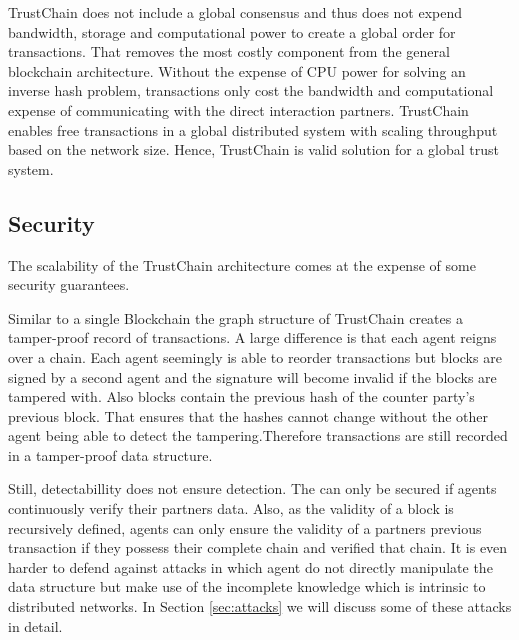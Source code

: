 TrustChain does not include a global consensus and thus does not expend bandwidth, storage and 
computational power to create a global order for transactions. That removes the most costly component
from the general blockchain architecture. Without the expense of CPU power for solving an inverse 
hash problem, transactions only cost the bandwidth and computational expense of communicating with 
the direct interaction partners. TrustChain enables free transactions in a global distributed 
system with scaling throughput based on the network size. Hence, TrustChain is valid solution for a
global trust system.

\subsection{Security}
The scalability of the TrustChain architecture comes at the expense of some security guarantees.

Similar to a single Blockchain the graph structure of TrustChain creates a tamper-proof record of
transactions. A large difference is that each agent reigns over a chain. Each agent seemingly is 
able to reorder transactions but blocks are signed by a second agent and the signature will become
invalid if the blocks are tampered with. Also blocks contain the previous hash of the counter party's
previous block. That ensures that the hashes cannot change without the other agent being able to 
detect the tampering.Therefore transactions are still recorded in a tamper-proof data structure.

Still, detectabillity does not ensure detection. The can only be secured if agents
continuously verify their partners data. Also, as the validity of a block is recursively defined, 
agents can only ensure the validity of a partners previous transaction if they possess their complete
chain and verified that chain. It is even harder to defend against attacks in which agent do not 
directly manipulate the data structure but make use of the incomplete knowledge which is intrinsic 
to distributed networks. In Section \ref{sec:attacks} we will discuss some of these attacks in detail.


